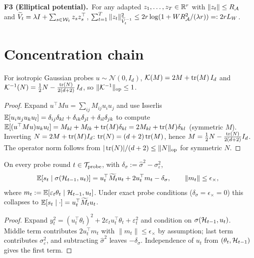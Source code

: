 \noindent\textbf{F3 (Elliptical potential).}\ For any adapted
$z_1,\dots,z_T\in\mathbb{R}^r$ with $\|z_t\|\le R_{\mathcal{A}}$ and
$\widetilde V_t = \lambda I + \sum_{s\in\mathcal{W}_t} z_s z_s^\top$,
$\sum_{t=1}^T \|z_t\|^2_{\widetilde V_t^{-1}}
\le 2r\log(1 + W R_{\mathcal{A}}^2/(\lambda r)) =: 2r L_W$.

\section*{Concentration chain}

\begin{lemma}
\label{lem:K_inverse}
For isotropic Gaussian probes $u\sim\mathcal N(0,I_d)$,
$\mathcal K(M) = 2M + \operatorname{tr}(M)\,I_d$ and
$\mathcal K^{-1}(N) = \tfrac12 N - \tfrac{\operatorname{tr}(N)}{2(d+2)}\,I_d$, so
$\|\mathcal K^{-1}\|_{\mathrm{op}} \le 1$.
\end{lemma}
\begin{proof}
Expand $u^\top M u = \sum_{ij} M_{ij} u_i u_j$ and use Isserlis
$\mathbb{E}[u_i u_j u_k u_l] = \delta_{ij}\delta_{kl} +
\delta_{ik}\delta_{jl} + \delta_{il}\delta_{jk}$ to compute
$\mathbb{E}[(u^\top M u)u_k u_l] = M_{kl}+M_{lk}+\operatorname{tr}(M)\delta_{kl} = 2M_{kl}
+ \operatorname{tr}(M)\delta_{kl}$ (symmetric $M$). Inverting
$N = 2M + \operatorname{tr}(M)I_d$: $\operatorname{tr}(N) = (d+2)\operatorname{tr}(M)$, hence
$M = \tfrac12 N - \tfrac{\operatorname{tr}(N)}{2(d+2)}I_d$. The operator norm
follows from $|\operatorname{tr}(N)|/(d+2)\le\|N\|_{\mathrm{op}}$ for symmetric $N$.
\end{proof}

\begin{lemma}
\label{lem:quad_conf}
On every probe round $t\in\mathcal{T}_{\mathrm{probe}}$, with
$\delta_\sigma := \hat\sigma^2 - \sigma_\varepsilon^2$,
\[
\mathbb{E}[s_t\mid\sigma(\mathcal{H}_{t-1},u_t)]
= u_t^\top \widetilde M_t u_t + 2 u_t^\top m_t - \delta_\sigma,\qquad \|m_t\|\le\epsilon_\times,
\]
where $m_t:=\mathbb{E}[\varepsilon_t\theta_t\mid\mathcal{H}_{t-1},u_t]$. Under exact
probe conditions ($\delta_\sigma=\epsilon_\times=0$) this collapses to
$\mathbb{E}[s_t\mid\cdot] = u_t^\top\widetilde M_t u_t$.
\end{lemma}
\begin{proof}
Expand $y_t^2 = (u_t^\top\theta_t)^2 + 2\varepsilon_t u_t^\top\theta_t
+ \varepsilon_t^2$ and condition on $\sigma(\mathcal{H}_{t-1},u_t)$. Middle
term contributes $2u_t^\top m_t$ with $\|m_t\|\le\epsilon_\times$ by
assumption; last term contributes $\sigma_\varepsilon^2$, and
subtracting $\hat\sigma^2$ leaves $-\delta_\sigma$. Independence of
$u_t$ from $(\theta_t,\mathcal{H}_{t-1})$ gives the first term.
\end{proof}

